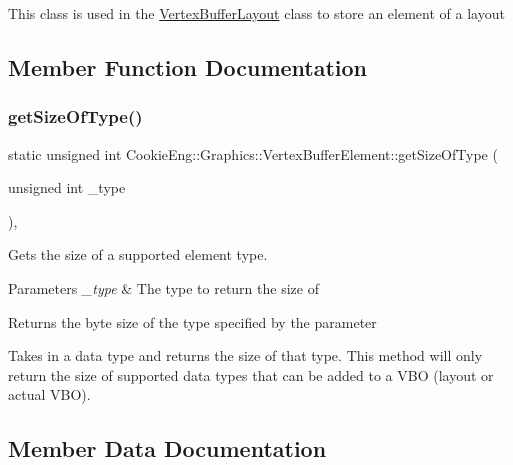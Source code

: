 This class is used in the \hyperlink{class_cookie_eng_1_1_graphics_1_1_vertex_buffer_layout}{Vertex\+Buffer\+Layout} class to store an element of a layout 

\subsection{Member Function Documentation}
\mbox{\label{struct_cookie_eng_1_1_graphics_1_1_vertex_buffer_element_a2041f09a7eb0714959f1be6f67fb111b}} 
\subsubsection{\texorpdfstring{get\+Size\+Of\+Type()}{getSizeOfType()}}
{\footnotesize\ttfamily static unsigned int Cookie\+Eng\+::\+Graphics\+::\+Vertex\+Buffer\+Element\+::get\+Size\+Of\+Type (\begin{DoxyParamCaption}\item[{unsigned int}]{\+\_\+type }\end{DoxyParamCaption})\hspace{0.3cm}{\ttfamily [inline]}, {\ttfamily [static]}}



Gets the size of a supported element type. 


\begin{DoxyParams}{Parameters}
{\em \+\_\+type} & The type to return the size of \\
\hline
\end{DoxyParams}
\begin{DoxyReturn}{Returns}
the byte size of the type specified by the parameter
\end{DoxyReturn}
Takes in a data type and returns the size of that type. This method will only return the size of supported data types that can be added to a V\+BO (layout or actual V\+BO). 

\subsection{Member Data Documentation}
\mbox{\label{struct_cookie_eng_1_1_graphics_1_1_vertex_buffer_element_a5c5d5a5861ed76486f0ea36e8db6ed4c}} 
